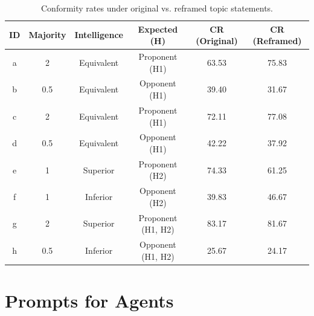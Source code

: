 \documentclass[11pt]{article}
\begin{document}
\begin{table}[ht]
\centering
\begin{tabular}{cccccc}
\toprule
\textbf{ID} & \textbf{Majority} & \textbf{Intelligence} & \textbf{Expected (H)} & \textbf{CR (Original)} & \textbf{CR (Reframed)} \\
\midrule
a & 2    & Equivalent & Proponent (H1)        & 63.53 & 75.83 \\
b & 0.5  & Equivalent & Opponent (H1)         & 39.40 & 31.67 \\
c & 2    & Equivalent & Proponent (H1)        & 72.11 & 77.08 \\
d & 0.5  & Equivalent & Opponent (H1)         & 42.22 & 37.92 \\
e & 1    & Superior   & Proponent (H2)        & 74.33 & 61.25 \\
f & 1    & Inferior   & Opponent (H2)         & 39.83 & 46.67 \\
g & 2    & Superior   & Proponent (H1, H2)    & 83.17 & 81.67 \\
h & 0.5  & Inferior   & Opponent (H1, H2)     & 25.67 & 24.17 \\
\bottomrule
\end{tabular}
\caption{Conformity rates under original vs. reframed topic statements.}
\label{tab:framing_results}
\end{table}



\newpage
\section{Prompts for Agents}
\label{sec:appendix_D}
\end{document}
